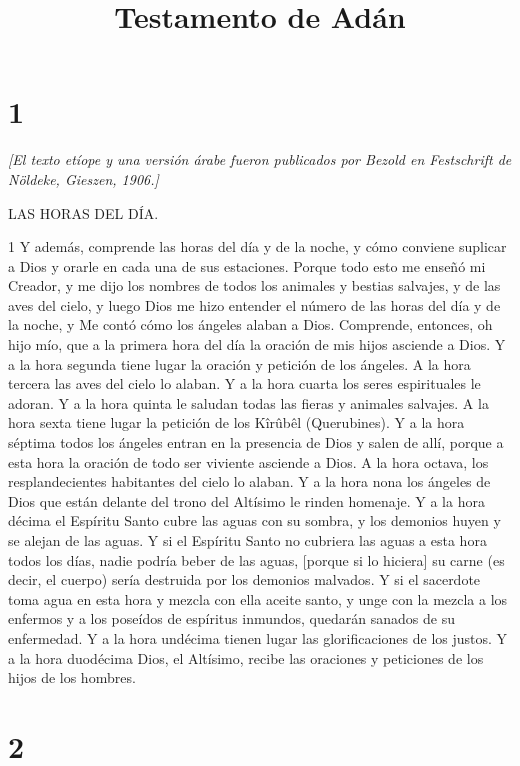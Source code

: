

\title{Testamento de Adán}

\chapter{1}

\par \textit{[El texto etíope y una versión árabe fueron publicados por Bezold en Festschrift de Nöldeke, Gieszen, 1906.]}

\par LAS HORAS DEL DÍA.

\par 1 Y además, comprende las horas del día y de la noche, y cómo conviene suplicar a Dios y orarle en cada una de sus estaciones. Porque todo esto me enseñó mi Creador, y me dijo los nombres de todos los animales y bestias salvajes, y de las aves del cielo, y luego Dios me hizo entender el número de las horas del día y de la noche, y Me contó cómo los ángeles alaban a Dios. Comprende, entonces, oh hijo mío, que a la primera hora del día la oración de mis hijos asciende a Dios. Y a la hora segunda tiene lugar la oración y petición de los ángeles. A la hora tercera las aves del cielo lo alaban. Y a la hora cuarta los seres espirituales le adoran. Y a la hora quinta le saludan todas las fieras y animales salvajes. A la hora sexta tiene lugar la petición de los Kîrûbêl (Querubines). Y a la hora séptima todos los ángeles entran en la presencia de Dios y salen de allí, porque a esta hora la oración de todo ser viviente asciende a Dios. A la hora octava, los resplandecientes habitantes del cielo lo alaban. Y a la hora nona los ángeles de Dios que están delante del trono del Altísimo le rinden homenaje. Y a la hora décima el Espíritu Santo cubre las aguas con su sombra, y los demonios huyen y se alejan de las aguas. Y si el Espíritu Santo no cubriera las aguas a esta hora todos los días, nadie podría beber de las aguas, [porque si lo hiciera] su carne (es decir, el cuerpo) sería destruida por los demonios malvados. Y si el sacerdote toma agua en esta hora y mezcla con ella aceite santo, y unge con la mezcla a los enfermos y a los poseídos de espíritus inmundos, quedarán sanados de su enfermedad. Y a la hora undécima tienen lugar las glorificaciones de los justos. Y a la hora duodécima Dios, el Altísimo, recibe las oraciones y peticiones de los hijos de los hombres.

\chapter{2}

